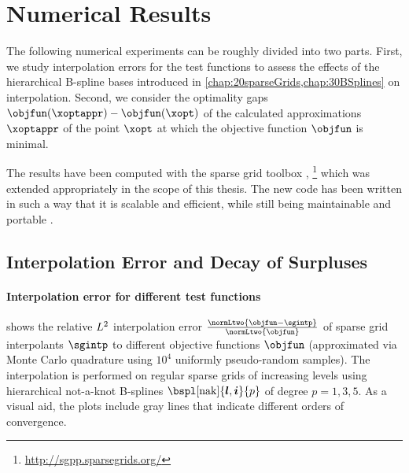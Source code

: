 \fillsectionornament
\section{Numerical Results}
\label{sec:54results}


\noindent
The following numerical experiments can be roughly divided into two parts.
First, we study interpolation errors for the test functions
to assess the effects of the hierarchical B-spline bases introduced in
\cref{chap:20sparseGrids,chap:30BSplines} on interpolation.
Second, we consider the optimality gaps $\objfun(\xoptappr) - \objfun(\xopt)$
of the calculated approximations $\xoptappr$
of the point $\xopt$ at which the objective function $\objfun$
is minimal.

\pagebreak

The results have been computed with the sparse grid toolbox \sgpp
\cite{Pflueger10Spatially},%
\footnote{%
  \url{http://sgpp.sparsegrids.org/}%
}
which was extended appropriately in the scope of this thesis.
The new code has been written in such a way that
it is scalable and efficient, while still being maintainable and
portable \cite{Pflueger16Scalability}.



\subsection{Interpolation Error and Decay of Surpluses}
\label{sec:541interpolation}

\paragraph{Interpolation error for different test functions}

 shows the
relative $L^2$ interpolation error
$\tfrac{\normLtwo{\objfun - \sgintp}}{\normLtwo{\objfun}}$
of sparse grid interpolants $\sgintp$ to
different objective functions $\objfun$
(approximated via Monte Carlo quadrature using
$10^4$ uniformly pseudo-random samples).
The interpolation is performed on regular sparse grids of increasing levels
using hierarchical not-a-knot B-splines $\bspl[\nak]{\*l,\*i}{p}$
of degree $p = 1, 3, 5$.
As a visual aid, the plots include gray lines that indicate different
orders of convergence.

